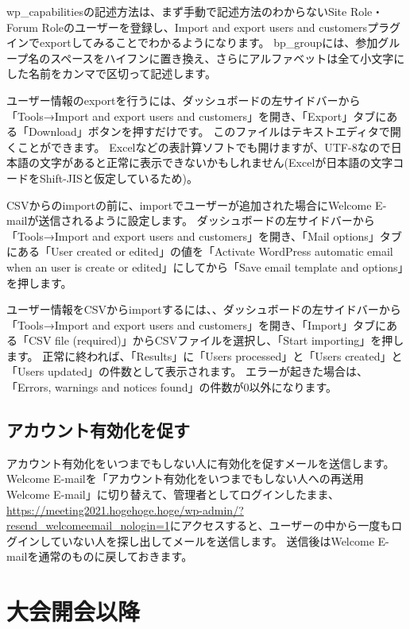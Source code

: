 \documentclass[titlepage,10pt,a4paper,uplatex]{jsbook}
\begin{document}
wp\_capabilitiesの記述方法は、まず手動で記述方法のわからないSite Role・Forum Roleのユーザーを登録し、Import and export users and customersプラグインでexportしてみることでわかるようになります。
bp\_groupには、参加グループ名のスペースをハイフンに置き換え、さらにアルファベットは全て小文字にした名前をカンマで区切って記述します。

ユーザー情報のexportを行うには、ダッシュボードの左サイドバーから「Tools→Import and export users and customers」を開き、「Export」タブにある「Download」ボタンを押すだけです。
このファイルはテキストエディタで開くことができます。
Excelなどの表計算ソフトでも開けますが、UTF-8なので日本語の文字があると正常に表示できないかもしれません(Excelが日本語の文字コードをShift-JISと仮定しているため)。

CSVからのimportの前に、importでユーザーが追加された場合にWelcome E-mailが送信されるように設定します。
ダッシュボードの左サイドバーから「Tools→Import and export users and customers」を開き、「Mail options」タブにある「User created or edited」の値を「Activate WordPress automatic email when an user is create or edited」にしてから「Save email template and options」を押します。

ユーザー情報をCSVからimportするには、、ダッシュボードの左サイドバーから「Tools→Import and export users and customers」を開き、「Import」タブにある「CSV file (required)」からCSVファイルを選択し、「Start importing」を押します。
正常に終われば、「Results」に「Users processed」と「Users created」と「Users updated」の件数として表示されます。
エラーが起きた場合は、「Errors, warnings and notices found」の件数が0以外になります。

\subsection{アカウント有効化を促す}

アカウント有効化をいつまでもしない人に有効化を促すメールを送信します。
Welcome E-mailを「アカウント有効化をいつまでもしない人への再送用Welcome E-mail」に切り替えて、管理者としてログインしたまま、\url{https://meeting2021.hogehoge.hoge/wp-admin/?resend_welcomeemail_nologin=1}にアクセスすると、ユーザーの中から一度もログインしていない人を探し出してメールを送信します。
送信後はWelcome E-mailを通常のものに戻しておきます。

\section{大会開会以降}
\end{document}
